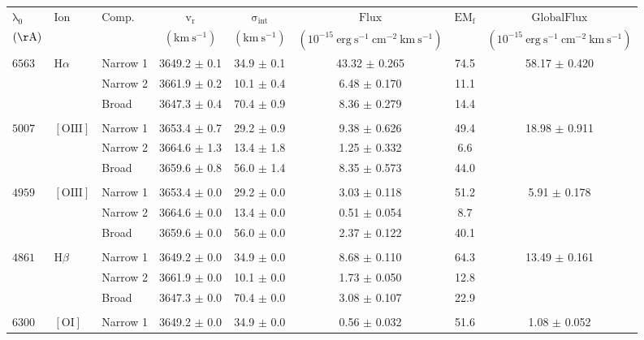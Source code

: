 \documentclass{article}
\begin{document}
\begin{longtable}{lllccccc}
\hline
$\mathrm{\lambda_0}$ & $\mathrm{Ion}$ & $\mathrm{Comp.}$ & $\mathrm{v_r}$ & $\mathrm{\sigma_{int}}$ & $\mathrm{Flux}$ & $\mathrm{EM_f}$ & $\mathrm{GlobalFlux}$ \\ 
\scriptsize $(\mathrm{\AA})$ & \scriptsize  & \scriptsize  & \scriptsize $(\mathrm{km \ s^{-1}})$ & \scriptsize $(\mathrm{km \ s^{-1}})$ & \scriptsize $(\mathrm{10^{-15} \ erg \ s^{-1} \ cm^{-2} \ km \ s^{-1}})$ & \scriptsize  & \scriptsize $(\mathrm{10^{-15} \ erg \ s^{-1} \ cm^{-2} \ km \ s^{-1}})$ \\ 
\hline
\endhead
$6563$ & $\mathrm{H}\alpha$ & Narrow 1 & 3649.2 $\pm$ 0.1 & 34.9 $\pm$ 0.1 & 43.32 $\pm$ 0.265 & 74.5 & 58.17 $\pm$ 0.420 \\ 
 &  & Narrow 2 & 3661.9 $\pm$ 0.2 & 10.1 $\pm$ 0.4 & 6.48 $\pm$ 0.170 & 11.1 &  \\ 
 &  & Broad & 3647.3 $\pm$ 0.4 & 70.4 $\pm$ 0.9 & 8.36 $\pm$ 0.279 & 14.4 &  \\ 
 &  &  &  &  &  &  &  \\ 
$5007$ & $\mathrm{[OIII]}$ & Narrow 1 & 3653.4 $\pm$ 0.7 & 29.2 $\pm$ 0.9 & 9.38 $\pm$ 0.626 & 49.4 & 18.98 $\pm$ 0.911 \\ 
 &  & Narrow 2 & 3664.6 $\pm$ 1.3 & 13.4 $\pm$ 1.8 & 1.25 $\pm$ 0.332 & 6.6 &  \\ 
 &  & Broad & 3659.6 $\pm$ 0.8 & 56.0 $\pm$ 1.4 & 8.35 $\pm$ 0.573 & 44.0 &  \\ 
 &  &  &  &  &  &  &  \\ 
$4959$ & $\mathrm{[OIII]}$ & Narrow 1 & 3653.4 $\pm$ 0.0 & 29.2 $\pm$ 0.0 & 3.03 $\pm$ 0.118 & 51.2 & 5.91 $\pm$ 0.178 \\ 
 &  & Narrow 2 & 3664.6 $\pm$ 0.0 & 13.4 $\pm$ 0.0 & 0.51 $\pm$ 0.054 & 8.7 &  \\ 
 &  & Broad & 3659.6 $\pm$ 0.0 & 56.0 $\pm$ 0.0 & 2.37 $\pm$ 0.122 & 40.1 &  \\ 
 &  &  &  &  &  &  &  \\ 
$4861$ & $\mathrm{H}\beta$ & Narrow 1 & 3649.2 $\pm$ 0.0 & 34.9 $\pm$ 0.0 & 8.68 $\pm$ 0.110 & 64.3 & 13.49 $\pm$ 0.161 \\ 
 &  & Narrow 2 & 3661.9 $\pm$ 0.0 & 10.1 $\pm$ 0.0 & 1.73 $\pm$ 0.050 & 12.8 &  \\ 
 &  & Broad & 3647.3 $\pm$ 0.0 & 70.4 $\pm$ 0.0 & 3.08 $\pm$ 0.107 & 22.9 &  \\ 
 &  &  &  &  &  &  &  \\ 
$6300$ & $\mathrm{[OI]}$ & Narrow 1 & 3649.2 $\pm$ 0.0 & 34.9 $\pm$ 0.0 & 0.56 $\pm$ 0.032 & 51.6 & 1.08 $\pm$ 0.052 \\ 

\end{longtable}
\end{document}
